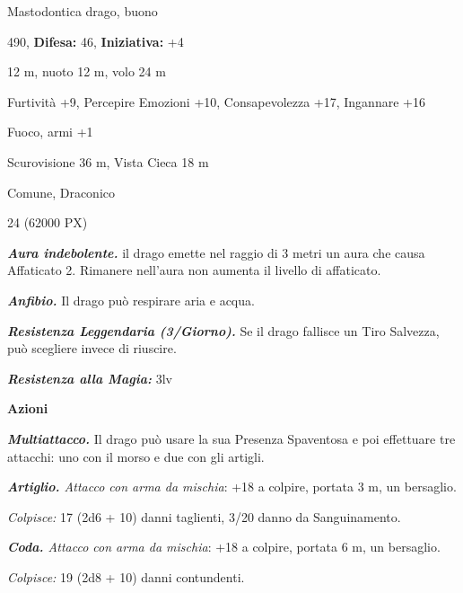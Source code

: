 \begin{multicols}{2}
{
\noindent
\begin{description}[noitemsep, topsep=0pt, parsep=0pt, partopsep=0pt, leftmargin=0cm, labelwidth=2.2cm]
	\item[\textbf{Taglia/Tipo:}] Mastodontica drago, buono
	\item[\textbf{Caratt.:}] 
	\item[\textbf{Punti Ferita:}] 490,  \textbf{Difesa:} 46,  \textbf{Iniziativa:} +4
	\item[\textbf{Movimento:}] 12 m, nuoto 12 m, volo 24 m
	\item[\textbf{Tiri Salvez.:}] 
	\item[\textbf{Comp.:}] Furtività +9, Percepire Emozioni +10, Consapevolezza +17, Ingannare +16
	\item[\textbf{Imm. Danni:}] Fuoco, armi +1
	\item[\textbf{Sensi:}] Scurovisione 36 m, Vista Cieca 18 m
	\item[\textbf{Linguaggi:}] Comune, Draconico
	\item[\textbf{Sfida:}] 24 (62000 PX)\smallskip
\end{description}

\emph{\textbf{Aura indebolente.}} il drago emette nel raggio di 3 metri un aura che causa Affaticato 2. Rimanere nell'aura non aumenta il livello di affaticato.

\emph{\textbf{Anfibio.}} Il drago può respirare aria e acqua.

\emph{\textbf{Resistenza Leggendaria (3/Giorno).}} Se il drago fallisce un Tiro Salvezza, può scegliere invece di riuscire.

\emph{\textbf{Resistenza alla Magia:}} 3lv

\textbf{Azioni}

\emph{\textbf{Multiattacco.}} Il drago può usare la sua Presenza Spaventosa e poi effettuare tre attacchi: uno con il morso e due con gli artigli.

\emph{\textbf{Artiglio.} Attacco con arma da mischia}: +18 a colpire, portata 3 m, un bersaglio.

\emph{Colpisce:} 17 (2d6 + 10) danni taglienti, 3/20 danno da Sanguinamento.

\emph{\textbf{Coda.} Attacco con arma da mischia}: +18 a colpire, portata 6 m, un bersaglio.

\emph{Colpisce:} 19 (2d8 + 10) danni contundenti.

}
\end{multicols}
